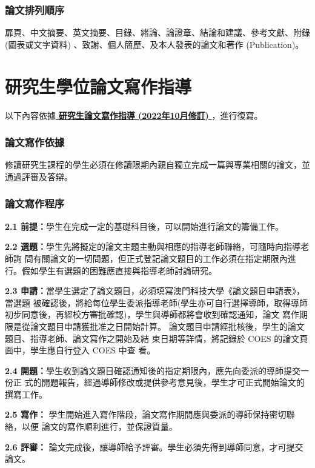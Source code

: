 \documentclass[
    writingLanguage=chinese, %
    addPageTitle=on,  %
    addDeclaration=on, %
    addMUSTlog=on, %
    addFigTOC=on, %
    addTabTOC=on, %
    refIndent=off, %
    printMod=off, %
]{must}
\begin{document}
\addinfo
\subsection{論文排列順序}
扉頁、中文摘要、英文摘要、目錄、緒論、論證章、結論和建議、參考文獻、附錄
(圖表或文字資料) 、致謝、個人簡歷、及本人發表的論文和著作 (Publication)。






\chapter{研究生學位論文寫作指導}
\noindent 以下內容依據\href{https://www.must.edu.mo/images/GSO/files/sgsdocument/GS002.pdf}{\textbf{ 研究生論文寫作指導 (2022年10月修訂) }}，進行復寫。

\subsection{論文寫作依據}
修讀研究生課程的學生必須在修讀限期內親自獨立完成一篇與專業相關的論文，並通過評審及答辯。
\subsection{論文寫作程序}

\noindent \textbf{2.1 前提：}學生在完成一定的基礎科目後，可以開始進行論文的籌備工作。

\noindent \textbf{2.2 選題：}學生先將擬定的論文主題主動與相應的指導老師聯絡，可隨時向指導老師詢
問有關論文的一切問題，但正式登記論文題目的工作必須在指定期限內進
行。假如學生有選題的困難應直接與指導老師討論研究。

\noindent \textbf{2.3 申請：}當學生選定了論文題目，必須填寫澳門科技大學《論文題目申請表》，當選題
被確認後，將給每位學生委派指導老師(學生亦可自行選擇導師，取得導師
初步同意後，再經校方審批確認)，學生與導師都將會收到確認通知，論文
寫作期限是從論文題目申請獲批准之日開始計算。
 論文題目申請經批核後，學生的論文題目、指導老師、論文寫作之開始及結
束日期等詳情，將記錄於 COES 的論文頁面中，學生應自行登入 COES 中查
看。

\noindent \textbf{2.4 開題：}學生收到論文題目確認通知後的指定期限內，應先向委派的導師提交一份正
式的開題報告，經過導師修改或提供參考意見後，學生才可正式開始論文的
撰寫工作。

\noindent \textbf{2.5 寫作：} 學生開始進入寫作階段，論文寫作期間應與委派的導師保持密切聯絡，以便
論文的寫作順利進行，並保證質量。

\noindent \textbf{2.6 評審：} 論文完成後，讓導師給予評審。學生必須先得到導師同意，才可提交論文。
\end{document}
